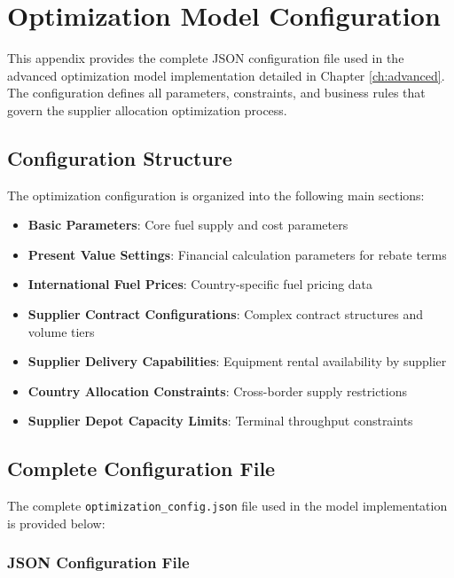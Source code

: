 \chapter{Optimization Model Configuration}
\label{cha:optimization-config}

This appendix provides the complete JSON configuration file used in the advanced optimization model implementation detailed in Chapter \ref{ch:advanced}. The configuration defines all parameters, constraints, and business rules that govern the supplier allocation optimization process.

\section{Configuration Structure}

The optimization configuration is organized into the following main sections:
\begin{itemize}
    \item \textbf{Basic Parameters}: Core fuel supply and cost parameters
    \item \textbf{Present Value Settings}: Financial calculation parameters for rebate terms
    \item \textbf{International Fuel Prices}: Country-specific fuel pricing data
    \item \textbf{Supplier Contract Configurations}: Complex contract structures and volume tiers
    \item \textbf{Supplier Delivery Capabilities}: Equipment rental availability by supplier
    \item \textbf{Country Allocation Constraints}: Cross-border supply restrictions
    \item \textbf{Supplier Depot Capacity Limits}: Terminal throughput constraints
\end{itemize}

\section{Complete Configuration File}

The complete \texttt{optimization\_config.json} file used in the model implementation is provided below:

\subsection{JSON Configuration File}
\label{subsec:json-config}

